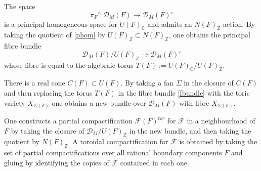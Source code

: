 \documentclass[11pt]{amsart}
\newcommand{\CC}{\mathbb{C}}
\newcommand{\ZZ}{\mathbb{Z}}
\newcommand{\dc}{\mathcal{D}}
\newcommand{\fc}{\mathcal{F}}
\begin{document}
The space 
\begin{equation}\label{phom}
\pi_F':\dc_M(F) \rightarrow \dc_M(F)'
\end{equation}
is a principal homogeneous space for $U(F)_{\CC}$ and admits an $N(F)_{\ZZ}$-action.
By taking the quotient of \eqref{phom} by $U(F)_{\ZZ} \subset N(F)_{\ZZ}$, one obtains the principal fibre bundle
\begin{equation}\label{fbundle}
\dc_M(F) / U(F)_{\ZZ} \rightarrow \dc_M(F)'
\end{equation}
whose fibre is equal to the algebraic torus $T(F):=U(F)_{\CC} / U(F)_{\ZZ}$.  

There is a real cone $C(F) \subset U(F)$.
By taking a fan $\Sigma$ in the closure of $C(F)$ and then replacing the torus $T(F)$ in the fibre bundle \eqref{fbundle} with the toric variety $X_{\Sigma(F)}$ one obtains a new bundle over $\dc_M(F)$ with fibre $X_{\Sigma(F)}$.

One constructs a partial compactification $\fc(F)^{tor}$ for $\fc$ in a neighbourhood of $F$ by taking the closure of $\dc_M/U(F)_{\ZZ}$ in the new bundle, and then taking the quotient by $N(F)_{\ZZ}$.
A toroidal compactification for $\fc$ is obtained by taking the set of partial compactifications over all rational boundary components $F$ and gluing by identifying the copies of $\fc$ contained in each one. 
\end{document}
